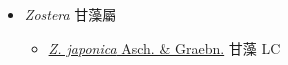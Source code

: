 
  \begin{itemize}
 \item[] \textit{Zostera} 甘藻屬
                                
  \begin{itemize}
        \item[] \href{http://www.theplantlist.org/tpl1.1/search?q=Zostera+japonica}{\textit{Z. japonica} Asch. \& Graebn.}   甘藻   LC
  \end{itemize}
  \end{itemize}
